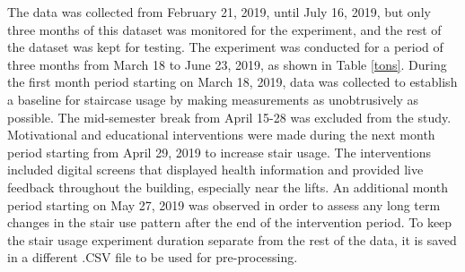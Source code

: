 \documentclass[../UNBThesis2.tex]{subfiles}
\begin{document}
\begin{itemize}





The data was collected from February 21, 2019, until July 16, 2019, but only three months of this dataset was monitored for the experiment, and the rest of the dataset was kept for testing. The experiment was conducted for a period of three months from March 18 to June 23, 2019, as shown in Table \ref{tons}. During the first month period starting on March 18, 2019, data was collected to establish a baseline for staircase usage by making measurements as unobtrusively as possible. The mid-semester break from April 15-28 was excluded from the study. Motivational and educational interventions were made during the next month period starting from April 29, 2019 to increase stair usage. The interventions included digital screens that displayed health information and provided live feedback throughout the building, especially near the lifts. An additional month period starting on May 27, 2019 was observed in order to assess any long term changes in the stair use pattern after the end of the intervention period. To keep the stair usage experiment duration separate from the rest of the data, it is saved in a different .CSV file to be used for pre-processing. 



\end{itemize}
\end{document}
